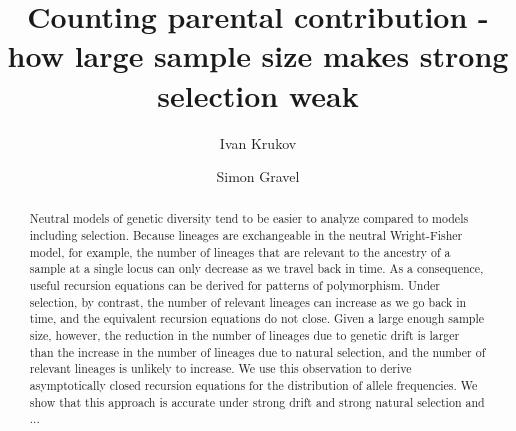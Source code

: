 \documentclass[review]{elsarticle}
\begin{document}
\begin{frontmatter}
  \title{Counting parental contribution - how large sample size makes strong selection weak}

  \author{Ivan Krukov}
  \author{Simon Gravel}

  \begin{abstract}
    Neutral models of genetic diversity tend to be easier to analyze compared to models including
     selection. Because lineages are exchangeable in the neutral Wright-Fisher model, 
     for example, the number of lineages that are relevant to the ancestry of a sample at a single locus 
     can only decrease as we travel back in time.   
    As a consequence, useful recursion equations can be derived for patterns of polymorphism.  
    Under selection, by contrast, the number of relevant lineages can increase as we go back in time, 
    and the equivalent recursion equations do not close.
    Given a large enough sample size, however, the reduction in the number of lineages due to genetic drift 
    is larger than the increase in the number of lineages due to natural selection, and the number of relevant 
    lineages is unlikely to increase.
    We use this observation to derive asymptotically closed recursion equations for the distribution of 
    allele frequencies. 
    We show that this approach is accurate under strong drift and strong natural selection and ... 
    
    
    
     
  \end{abstract}
\end{frontmatter}
\end{document}
